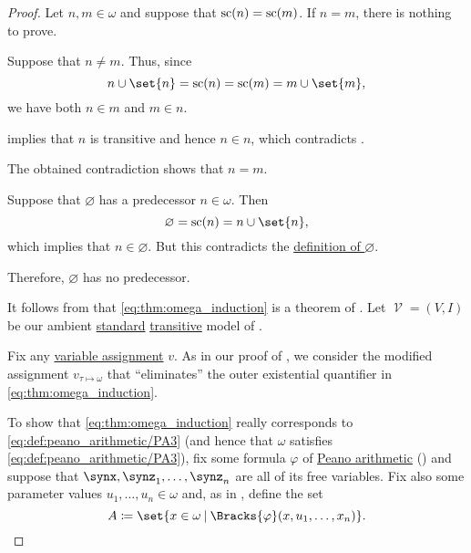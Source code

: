 \begin{proof}
   Let \( n, m \in \omega \) and suppose that \( \op{sc}(n) = \op{sc}(m) \). If \( n = m \), there is nothing to prove.

  Suppose that \( n \neq m \). Thus, since
  \begin{equation*}
    n \cup \set{ n } = \op{sc}(n) = \op{sc}(m) = m \cup \set{ m },
  \end{equation*}
  we have both \( n \in m \) and \( m \in n \).

   implies that \( n \) is transitive and hence \( n \in n \), which contradicts .

  The obtained contradiction shows that \( n = m \).

   Suppose that \( \varnothing \) has a predecessor \( n \in \omega \). Then
  \begin{equation*}
    \varnothing = \op{sc}(n) = n \cup \set{ n },
  \end{equation*}
  which implies that \( n \in \varnothing \). But this contradicts the \hyperref[def:empty_set]{definition of \( \varnothing \)}.

  Therefore, \( \varnothing \) has no predecessor.

   It follows from  that \eqref{eq:thm:omega_induction} is a theorem of . Let \( \mscrV = (V, I) \) be our ambient \hyperref[rem:standard_model_of_set_theory]{standard} \hyperref[rem:transitive_model_of_set_theory]{transitive} model of .

  Fix any \hyperref[def:first_order_valuation/variable_assignment]{variable assignment} \( v \). As in our proof of , we consider the modified assignment \( v_{\tau \mapsto \omega} \) that \enquote{eliminates} the outer existential quantifier in \eqref{eq:thm:omega_induction}.

  To show that \eqref{eq:thm:omega_induction} really corresponds to \eqref{eq:def:peano_arithmetic/PA3} (and hence that \( \omega \) satisfies \eqref{eq:def:peano_arithmetic/PA3}), fix some formula \( \varphi \) of \hyperref[def:peano_arithmetic]{Peano arithmetic} () and suppose that \( \synx, \synz_1, \ldots, \synz_n \) are all of its free variables. Fix also some parameter values \( u_1, \ldots, u_n \in \omega \) and, as in , define the set
  \begin{equation*}
    A \coloneqq \set{ x \in \omega \given \Bracks{\varphi}(x, u_1, \ldots, x_n) }.
  \end{equation*}


\end{proof}

